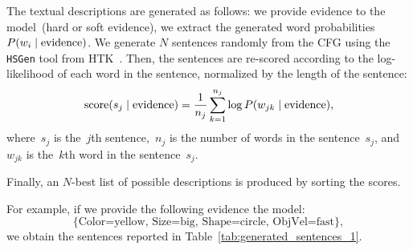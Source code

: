 The textual descriptions are generated as follows: we provide evidence to the model~(hard or soft evidence), we extract the generated word probabilities $P(w_i\mid \text{evidence})$.
We generate $N$ sentences randomly from the \ac{CFG} using the \texttt{HSGen} tool from HTK~\cite{young:htkbook}.
Then, the sentences are re-scored according to the log-likelihood of each word in the sentence, normalized by the length of the sentence:
\begin{equation*}
  \text{score}(s_j\mid \text{evidence}) = \frac{1}{n_j} \sum_{k=1}^{n_j} \log P(w_{jk}\mid \text{evidence}),
\end{equation*}
where~$s_j$ is the~$j$th sentence,~$n_j$ is the number of words in the sentence~$s_j$, and~$w_{jk}$ is the~$k$th word in the sentence~$s_j$.

Finally, an $N$-best list of possible descriptions is produced by sorting the scores.


For example, if we provide the following evidence the model:
\begin{equation*}
\{\text{Color=yellow, Size=big, Shape=circle, ObjVel=fast}\},
\end{equation*}
we obtain the sentences reported in Table~\ref{tab:generated_sentences_1}.

